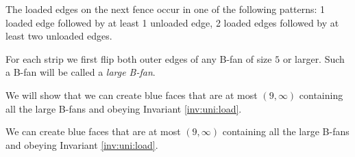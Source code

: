 \begin{invariants}
  \label{inv:uni:load}
  \item The loaded edges on the next fence occur in one of the following patterns: 1 loaded edge followed by at least 1 unloaded edge, 2 loaded edges followed by at least two unloaded edges.
\end{invariants}

For each strip we first flip both outer edges of any B-fan of size $5$ or larger. Such a B-fan will be called a \emph{large B-fan}.

We will show that we can create blue faces that are at most $(9, \infty)$ containing all the large B-fans and obeying Invariant \ref{inv:uni:load}.

\begin{lemma}
  \label{lm:uni:removingLargeB-fans}
  We can create blue faces that are at most $(9, \infty)$ containing all the large B-fans and obeying Invariant \ref{inv:uni:load}.
\end{lemma}


